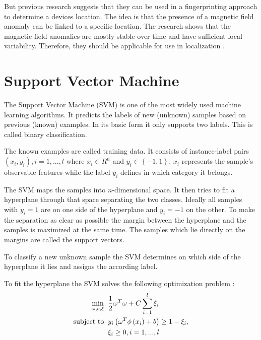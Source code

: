 But previous research suggests that they can be used in a fingerprinting approach to determine a devices location. The idea is that the presence of a magnetic field anomaly can be linked to a specific location. The research shows that the magnetic field anomalies are mostly stable over time and have sufficient local variability. Therefore, they should be applicable for use in localization \cite{haverinen2009global,angermann2012CharacterizationMagnetic,Li2012feasableMagnetic}.

\section{Support Vector Machine}
\label{theory:SVM}
The Support Vector Machine (SVM) is one of the most widely used machine learning algorithms. It predicts the labels of new (unknown) samples based on previous (known) examples. In its basic form it only supports two labels. This is called binary classification.

The known examples are called training data. It consists of instance-label pairs \(\left ( x_{i}, y_{i} \right ), i=1,...,l\) where \(x_{i}\in R^{n}\) and \(y_{i}\in \left \{ -1,1 \right \}\). \(x_{i}\) represents the sample's observable features while the label \(y_{i}\) defines in which category it belongs.

The SVM maps the samples into \(n\)-dimensional space. It then tries to fit a hyperplane through that space separating the two classes. Ideally all samples with \(y_{i}=1\) are on one side of the hyperplane and \(y_{i}=-1\) on the other. To make the separation as clear as possible the margin between the hyperplane and the samples is maximized at the same time. The samples which lie directly on the margins are called the support vectors.

To classify a new unknown sample the SVM determines on which side of the hyperplane it lies and assigns the according label.

To fit the hyperplane the SVM solves the following optimization problem \cite{chang2011libsvm}:
\begin{equation}
\begin{split}
\min_{\omega , b ,\xi}\;\; & \frac{1}{2}\omega^{T}\omega +C\sum_{i=1}^{l}\xi_{i}\\
\textup{subject to}\;\; & y_{i}\left ( \omega^{T}\phi \left ( x_{i} \right )+b \right )\geq 1-\xi_{i},\\
& \xi_{i}\geq 0,i=1,...,l
\end{split}
\end{equation}

